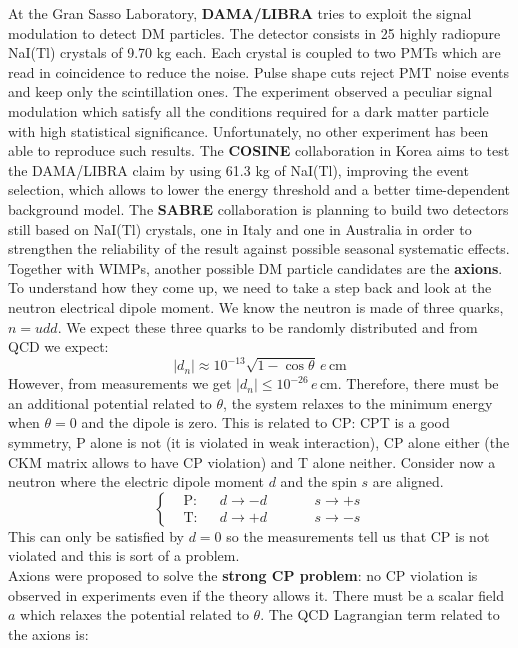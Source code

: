\documentclass[10.75pt,a4paper,openright,bottom=2cm]{article}
\begin{document}
At the Gran Sasso Laboratory, \textbf{DAMA/LIBRA} tries to exploit the signal modulation to detect DM particles. The detector consists in 25 highly radiopure NaI(Tl) crystals of 9.70 kg each. Each crystal is coupled to two PMTs which are read in coincidence to reduce the noise. Pulse shape cuts reject PMT noise events and keep only the scintillation ones. The experiment observed a peculiar signal modulation which satisfy all the conditions required for a dark matter particle with high statistical significance. Unfortunately, no other experiment has been able to reproduce such results. The \textbf{COSINE} collaboration in Korea aims to test the DAMA/LIBRA claim by using 61.3 kg of NaI(Tl), improving the event selection, which allows to lower the energy threshold and a better time-dependent background model. The \textbf{SABRE} collaboration is planning to build two detectors still based on NaI(Tl) crystals, one in Italy and one in Australia in order to strengthen the reliability of the result against possible seasonal systematic effects.\\
Together with WIMPs, another possible DM particle candidates are the \textbf{axions}. To understand how they come up, we need to take a step back and look at the neutron electrical dipole moment. We know the neutron is made of three quarks, $n=udd$. We expect these three quarks to be randomly distributed and from QCD we expect:
\[
|d_n|\approx10^{-13}\sqrt{1-\cos\theta}\,e\,\text{cm}
\]
However, from measurements we get $|d_n|\le10^{-26}\,e$\,cm. Therefore, there must be an additional potential related to $\theta$, the system relaxes to the minimum energy when $\theta=0$ and the dipole is zero. This is related to CP: CPT is a good symmetry, P alone is not (it is violated in weak interaction), CP alone either (the CKM matrix allows to have CP violation) and T alone neither. Consider now a neutron where the electric dipole moment $d$ and the spin $s$ are aligned.
\[
\left\{
\begin{aligned}
&\text{P}:&&d\to-d \quad &&&s\to+s\\
&\text{T}:&&d\to+d \quad &&&s\to-s
\end{aligned}
\right.
\]
This can only be satisfied by $d=0$ so the measurements tell us that CP is not violated and this is sort of a problem.\\
Axions were proposed to solve the \textbf{strong CP problem}: no CP violation is observed in experiments even if the theory allows it. There must be a scalar field $a$ which relaxes the potential related to $\theta$. The QCD Lagrangian term related to the axions is:
\end{document}
